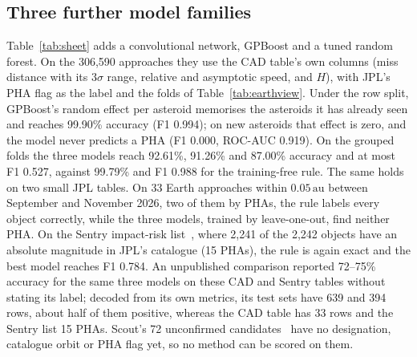 \documentclass[conference]{IEEEtran}
\newcommand{\au}{\,\mathrm{au}}
\begin{document}
\subsection{Three further model families}
Table~\ref{tab:sheet} adds a convolutional network, GPBoost and a tuned random forest. On the 306,590 approaches they use the CAD table's own columns (miss distance with its $3\sigma$ range, relative and asymptotic speed, and $H$), with JPL's PHA flag as the label and the folds of Table~\ref{tab:earthview}. Under the row split, GPBoost's random effect per asteroid memorises the asteroids it has already seen and reaches 99.90\% accuracy (F1 0.994); on new asteroids that effect is zero, and the model never predicts a PHA (F1 0.000, ROC-AUC 0.919). On the grouped folds the three models reach 92.61\%, 91.26\% and 87.00\% accuracy and at most F1 0.527, against 99.79\% and F1 0.988 for the training-free rule. The same holds on two small JPL tables. On 33 Earth approaches within $0.05\au$ between September and November 2026, two of them by PHAs, the rule labels every object correctly, while the three models, trained by leave-one-out, find neither PHA. On the Sentry impact-risk list~\cite{jpl_sentry_api}, where 2,241 of the 2,242 objects have an absolute magnitude in JPL's catalogue (15 PHAs), the rule is again exact and the best model reaches F1 0.784. An unpublished comparison reported 72--75\% accuracy for the same three models on these CAD and Sentry tables without stating its label; decoded from its own metrics, its test sets have 639 and 394 rows, about half of them positive, whereas the CAD table has 33 rows and the Sentry list 15 PHAs. Scout's 72 unconfirmed candidates~\cite{jpl_scout_api} have no designation, catalogue orbit or PHA flag yet, so no method can be scored on them.


\end{document}
